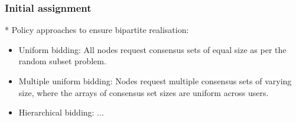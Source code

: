 %
%

\subsubsection{Initial assignment}

* Policy approaches to ensure bipartite realisation:
\begin{itemize}
	\item Uniform bidding: All nodes request consensus sets of equal size as per the random subset problem.
	\item Multiple uniform bidding: Nodes request multiple consensus sets of varying size, where the arrays of consensus set sizes are uniform across users.
	\item Hierarchical bidding: ...
\end{itemize}

